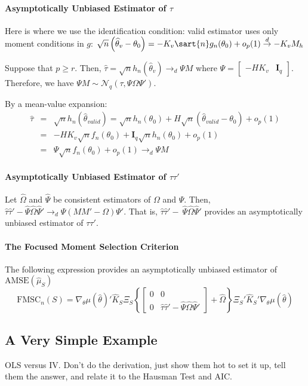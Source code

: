 \documentclass[12pt]{article}
\theoremstyle{definition}
\begin{document}
\paragraph{Asymptotically Unbiased Estimator of $\tau$} Here is where we use the identification condition: valid estimator uses only moment conditions in $g$: $\sqrt{n}\left(\widehat{\theta}_v - \theta_0 \right) =  -K_v \sart{n}g_n(\theta_0) + o_p(1) \overset{d}{\rightarrow} -K_v M_h$

Suppose that $p\geq r$. Then, $\widehat{\tau} = \sqrt{n} h_n(\widehat{\theta}_v) \rightarrow_d\Psi M$ where $\Psi = \left[\begin{array}{cc} -HK_v & \mathbf{I}_q \end{array}\right]$. Therefore, we have $\Psi M \sim \mathcal{N}_q(\tau, \Psi \Omega \Psi')$.

By a mean-value expansion:
	\begin{eqnarray*}
	\widehat{\tau} &=& \sqrt{n} h_n\left(\widehat{\theta}_{valid}\right) = \sqrt{n}h_n(\theta_0) + H \sqrt{n}\left(\widehat{\theta}_{valid} - \theta_0\right) + o_p(1)\\
		&=&-HK_{v} \sqrt{n}f_n(\theta_0) + \mathbf{I}_q\sqrt{n}h_n(\theta_0) +o_p(1)\\
		&=& \Psi \sqrt{n}f_n(\theta_0) + o_p(1) \rightarrow_d\Psi M
\end{eqnarray*}

\paragraph{Asymptotically Unbiased Estimator of $\tau\tau'$}
Let $\widehat{\Omega}$ and $\widehat{\Psi}$ be consistent estimators of $\Omega$ and $\Psi$. Then, $ \widehat{\tau}\widehat{\tau}' - \widehat{\Psi}\widehat{\Omega}\widehat{\Psi}' \rightarrow_d\Psi \left(MM' - \Omega\right)\Psi' $. That is, $\widehat{\tau}\widehat{\tau}' - \ \widehat{\Psi}\widehat{\Omega}\widehat{\Psi}' $ provides an asymptotically unbiased estimator of $\tau\tau'$.

\paragraph{The Focused Moment Selection Criterion} The following expression provides an asymptotically unbiased estimator of $\mbox{AMSE}(\widehat{\mu}_S)$
$$\mbox{FMSC}_n(S) = \nabla_\theta\mu(\widehat{\theta})'\widehat{K}_S\Xi_S \left\{\left[\begin{array}{cc}0&0\\0&\widehat{\tau}\widehat{\tau}' - \widehat{\Psi}\widehat{\Omega}\widehat{\Psi}'\end{array}\right] + \widehat{\Omega}\right\}\Xi_S'\widehat{K}_S' \nabla_\theta\mu(\widehat{\theta})$$

\subsection{A Very Simple Example}
OLS versus IV. Don't do the derivation, just show them hot to set it up, tell them the answer, and relate it to the Hausman Test and AIC.
\end{document}
